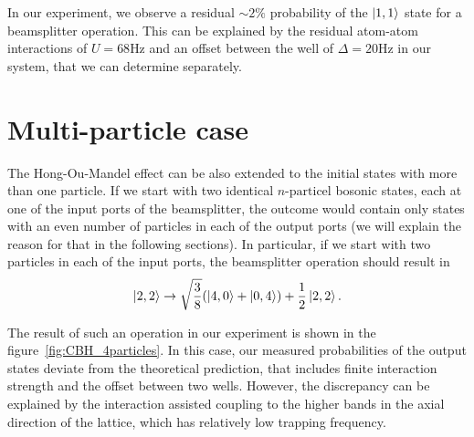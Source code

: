 In our experiment, we observe a residual $\sim 2\%$ probability of the $\left|1,1\right\rangle$ state for a beamsplitter operation. This can be explained by the residual atom-atom interactions of $U=68\textrm{Hz}$ and an offset between the well of $\Delta = 20\textrm{Hz}$ in our system, that we can determine separately.

\section{Multi-particle case}
The Hong-Ou-Mandel effect can be also extended to the initial states with more than one particle. If we start with two identical $n\textrm{-particel}$ bosonic states, each at one of the input ports of the beamsplitter, the outcome would contain only states with an even number of particles in each of the output ports (we will explain the reason for that in the following sections). In particular, if we start with two particles in each of the input ports, the beamsplitter operation should result in
\begin{equation}
\left|2,2\right\rangle\rightarrow \sqrt{\frac{3}{8}}(\left|4,0\right\rangle+\left|0,4\right\rangle)+\frac{1}{2} \left|2,2\right\rangle.
\end{equation}

The result of such an operation in our experiment is shown in the figure~\ref{fig:CBH_4particles}. In this case, our measured probabilities of the output states deviate from the theoretical prediction, that includes finite interaction strength and the offset between two wells. However, the discrepancy can be explained by the interaction assisted coupling to the higher bands in the axial direction of the lattice, which has relatively low trapping frequency.

